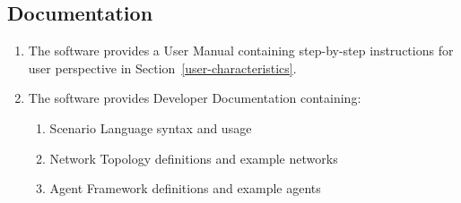 \documentclass[titlepage]{article}
\begin{document}

\subsection{Documentation%
  \label{documentation}%
}
\begin{enumerate}
    \item The software provides a User Manual containing step-by-step instructions for user perspective in Section~\ref{user-characteristics}.
    \item The software provides Developer Documentation containing:
    \begin{enumerate}
        \item Scenario Language syntax and usage
        \item Network Topology definitions and example networks
        \item Agent Framework definitions and example agents
    \end{enumerate}
\end{enumerate}


\appendix
\pagebreak
\end{document}
